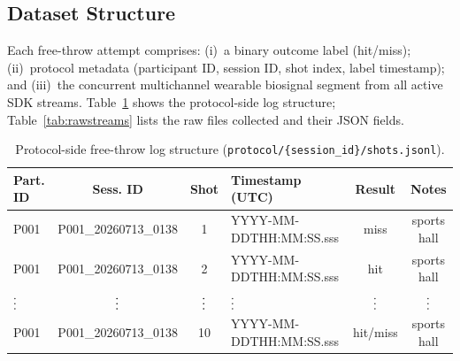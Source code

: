 \documentclass[sensors,article,submit,pdftex,moreauthors]{Definitions/mdpi}
\begin{document}
\subsection{Dataset Structure}



Each free-throw attempt comprises: (i)~a binary outcome label (hit/miss); (ii)~protocol metadata (participant ID, session ID, shot index, label timestamp); and (iii)~the concurrent multichannel wearable biosignal segment from all active SDK streams. Table~\ref{tab:shootlog} shows the protocol-side log structure; Table~\ref{tab:rawstreams} lists the raw files collected and their JSON fields.



\begin{table}[H]

\caption{Protocol-side free-throw log structure (\texttt{protocol/\{session\_id\}/shots.jsonl}).\label{tab:shootlog}}

\small

\begin{tabularx}{\textwidth}{@{}lccXcc@{}}

\toprule

\textbf{Part. ID} & \textbf{Sess. ID} & \textbf{Shot} & \textbf{Timestamp (UTC)} & \textbf{Result} & \textbf{Notes} \\

\midrule

P001 & P001\_20260713\_0138 & 1 & YYYY-MM-DDTHH:MM:SS.sss & miss & sports hall \\

P001 & P001\_20260713\_0138 & 2 & YYYY-MM-DDTHH:MM:SS.sss & hit & sports hall \\

$\vcenter{\hbox{\vdots}}$ & $\vcenter{\hbox{\vdots}}$ & $\vcenter{\hbox{\vdots}}$ & $\vcenter{\hbox{\vdots}}$ & $\vcenter{\hbox{\vdots}}$ & $\vcenter{\hbox{\vdots}}$ \\

P001 & P001\_20260713\_0138 & 10 & YYYY-MM-DDTHH:MM:SS.sss & hit/miss & sports hall \\

\bottomrule

\end{tabularx}

\end{table}
\end{document}
